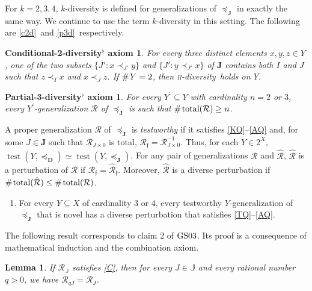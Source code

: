 \documentclass[ecta,nameyear,draft]{econsocart}
\newcommand{\test}{\operatorname{test}}
\newcommand{\countof}{\mathbin{\#}\hskip1pt}
\newcommand{\mc}{\mathcal}
\newcommand{\novel}{\mathfrak f}
\newcommand{\preceqb}{\mathbin{\preceq}}
\newcommand{\ext}{\mathrel{\mc R}}
\newcommand{\extb}{\mathbin{\mc R}}
\newcommand{\hext}{\mathrel{\hat{\mathrel{\mathcal R}}}}
\newcommand{\hextb}{\mathbin{\hat{\mathbin{\mathcal R}}}}
\newcommand{\total}{\textup{total}}
\newcommand{\mbbd}{{\mathbf D}}
\newcommand{\mbbj}{\mathbf J}
\newcommand{\mbbjpp}{\mathds{J}}
\newcommand{\twodiv}{\textsc{ii}-\textup{diversity}}
\newcommand{\gsii}{$\textup{GS03}$}
\theoremstyle{plain}
\newtheorem{lemma}{Lemma}[theorem]
\newtheorem*{condtwodivq*}{Conditional-2-diversity$^\flat$ axiom}
\newtheorem*{parthreedivq*}{Partial-3-diversity$^\flat$ axiom}
\theoremstyle{remark}
\begin{document}
\begin{appendix}
  For $k = 2, 3, 4$, $k$-diversity is defined for generalizations of
  $\preceq_{\mbbj}$ in exactly the same way. We continue to use the term
  $k$-diversity in this setting.  The following are \ref{c2d}\ and
  \ref{p3d}\ respectively.
  \begin{condtwodivq*}
    \label{c2dQ} For every three distinct elements $x , y , z \in Y$, one
      of the two subsets $\{J': x \prec_{J'} y \}$ and $\{J': y \prec_{J'} x\}$
      of $\mbbj$ contains both $I$ and $J$ such that $z \prec _{I} x$ and $x
      \prec _{J} z$. If $\countof Y = 2$, then \twodiv\ holds on $Y$.
  \end{condtwodivq*}
  \begin{parthreedivq*}
    \label{p3dQ} For every $Y^{\prime} \subseteq Y$ with cardinality $n =
      2$ or $3$, every $Y^{\prime}$-generalization $\ext$ of $\preceq
      _{\mbbj}$ is such that $\countof{\total(\ext)} \geq n$.
  \end{parthreedivq*}

  A proper generalization $\ext$ of $\preceqb _{\mbbj}$ is \emph{testworthy}
  if it satisfies \ref{KQ}--\ref{AQ} and, for some $J\in \mbbj$ such that
  $\ext_{J\times 0}$ is total, $\extb_{\novel} = \extb_{J\times 0}^{-1}$. Thus,
  for each $Y \in 2^{X}$, $\test ( Y , \preceqb _{\mbbd} ) \simeq \test ( Y ,
  \preceqb _{\mbbj })$. For any pair of generalizations $\ext$ and $\hext$,
  $\hext$ is a perturbation of $\ext$ if $\extb_{\novel} = \hextb_{\novel}$.
  Moreover, $\hext$ is a {{diverse}} perturbation if $\countof \total (\hext)
  \leq \countof \total (\ext)$.
  \begin{enumerate}[label=\textsc{iv}-\textup{S}$^{\flat}$]
    \item\label{PQ} For every $Y \subseteq X$ of cardinality $3$ or $4$, every
      testworthy $Y$-generalization of $\preceqb _{\mbbj}$ that is novel has
      a {{diverse}} perturbation that satisfies \ref{TQ}–\ref{AQ}.
  \end{enumerate}

  The following result corresponds to claim 2 of \gsii. Its proof is a
  consequence of mathematical induction and the combination axiom. \vskip-15pt
  \begin{lemma}\label{lem-coneQ} If $\ext _ \mbbjpp$  satisfies \ref{C}, then
    for every $J \in \mbbjpp$ and every rational number $q >0$, we have $\extb
    _{q J}  =  \extb _{J}$.
  \end{lemma}


\end{appendix}
\end{document}
